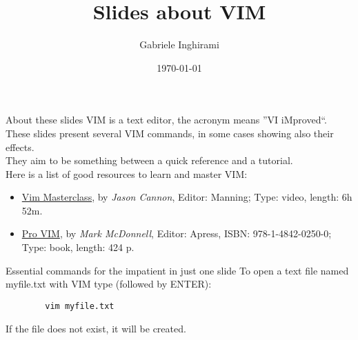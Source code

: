 

    
    \author[Gabriele Inghirami]{Gabriele Inghirami}
    \title[Slides about VIM]{Slides about VIM}
    \date{\today}
    \maketitle
    
    \begin{frame}{About these slides}
    VIM is a text editor, the acronym means ''VI iMproved``.\\
    These slides present several VIM commands, in some cases showing also their effects.\\
    They aim to be something between a quick reference and a tutorial.\\
    Here is a list of good resources to learn and master VIM:
    \begin{itemize}
        \item \href{https://www.manning.com/livevideo/vim-masterclass}{Vim Masterclass}, by \emph{Jason Cannon}, Editor: Manning;  Type: video, length: 6h 52m.
        \item \href{https://link.springer.com/book/10.1007/978-1-4842-0250-0}{Pro VIM}, by \emph{Mark McDonnell}, Editor: Apress, ISBN: 978-1-4842-0250-0; Type: book, length: 424 p.
    \end{itemize}
    \end{frame}
    
    \begin{frame}[fragile]{Essential commands for the impatient in just one slide}
    To open a text file named myfile.txt with VIM type (followed by ENTER):
    \begin{lstlisting}
    	vim myfile.txt
    \end{lstlisting}
    If the file does not exist, it will be created.
    \end{frame}
    
     

